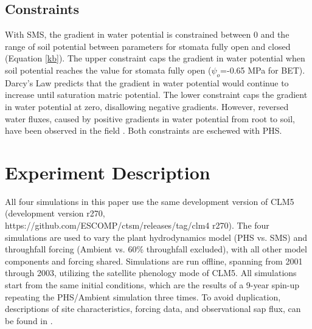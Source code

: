 \documentclass[draft,linenumbers]{agujournal}
\begin{document}
    \subsection{Constraints}
    With SMS, the gradient in water potential is constrained between 0 and 
    the range of soil potential between parameters for stomata fully open and closed (Equation \ref{kb}). 
    The upper constraint caps the gradient in water potential when soil potential reaches the value for stomata fully open ($\psi_o$=-0.65 MPa for BET).
    Darcy's Law predicts that the gradient in water potential would continue to increase until saturation matric potential.
    The lower constraint caps the gradient in water potential at zero, disallowing negative gradients.
    However, reversed water fluxes, caused by positive gradients in water potential from root to soil, have been observed in the field \citep{burgess1998}.
    Both constraints are eschewed with PHS.     

\section{Experiment Description}
All four simulations in this paper use the same development version of CLM5
(development version r270, https://github.com/ESCOMP/ctsm/releases/tag/clm4
\textunderscore r270).
The four simulations are used to vary the plant hydrodynamics model (PHS vs. SMS) and throughfall forcing (Ambient vs. 60\% throughfall excluded), with all other model components and forcing shared.
Simulations are run offline, spanning from 2001 through 2003, utilizing the satellite phenology mode of CLM5.
All simulations start from the same initial conditions, which are the results of a 9-year spin-up repeating the PHS/Ambient simulation three times.
To avoid duplication, descriptions of site characteristics, forcing data, and observational sap flux, can be found in \cite{fisher2007}.
\end{document}
